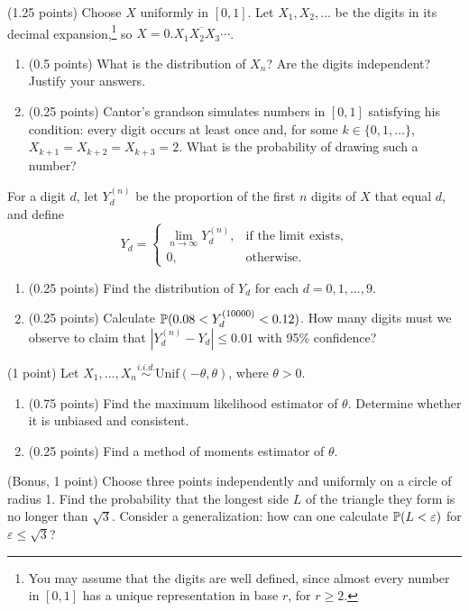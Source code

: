 \documentclass[a4paper]{report}
\begin{document}
\begin{problem} (1.25 points)
Choose $X$ uniformly in $[0,1]$. Let $X_1,X_2,\ldots$ be the digits in its decimal expansion,\footnote{You may assume that the digits are well defined, since almost every number in $[0,1]$ has a unique representation in base $r$, for $r\geq2$.} so $X=0.\overline{X_1X_2X_3\cdots}$.
\begin{enumerate}
\item (0.5 points) What is the distribution of $X_n$? Are the digits independent? Justify your answers.
\item (0.25 points) Cantor's grandson simulates numbers in $[0,1]$ satisfying his condition: every digit occurs at least once and, for some $k\in\{0,1,\ldots\}$, $X_{k+1}=X_{k+2}=X_{k+3}=2$. What is the probability of drawing such a number?
\end{enumerate}
For a digit $d$, let $Y_d^{(n)}$ be the proportion of the first $n$ digits of $X$ that equal $d$, and define
\[Y_d=\begin{cases}\displaystyle\lim_{n\to\infty}Y_d^{(n)},&\text{if the limit exists},\\0,&\text{otherwise.}\end{cases}\]
\begin{enumerate}[start=3]
\item (0.25 points) Find the distribution of $Y_d$ for each $d=0,1,\ldots,9$.
\item (0.25 points) Calculate $\P(0.08<Y_d^{(10000)}<0.12)$. How many digits must we observe to claim that $|Y_d^{(n)}-Y_d|\leq0.01$ with 95\% confidence?
\end{enumerate}
\end{problem}
\begin{problem} (1 point)
Let $X_1,\ldots,X_n\overset{i.i.d.}{\sim}\mathrm{Unif}(-\theta,\theta)$, where $\theta>0$.
\begin{enumerate}
\item (0.75 points) Find the maximum likelihood estimator of $\theta$. Determine whether it is unbiased and consistent.
\item (0.25 points) Find a method of moments estimator of $\theta$.
\end{enumerate}
\end{problem}
\begin{problem} (Bonus, 1 point)
Choose three points independently and uniformly on a circle of radius 1. Find the probability that the longest side $L$ of the triangle they form is no longer than $\sqrt3$. Consider a generalization: how can one calculate $\P(L<\varepsilon)$ for $\varepsilon\leq\sqrt3$?
\end{problem}
\end{document}
